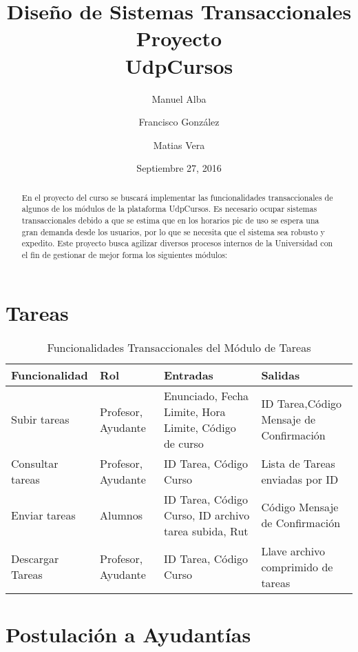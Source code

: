 \documentclass{article}
\title{Diseño de Sistemas Transaccionales \\ \huge Proyecto \\ \Huge UdpCursos }
\author{Manuel Alba \and Francisco González \and Matias Vera}
\date{Septiembre 27, 2016}
\begin{document}
\maketitle

\begin{abstract}
    En el proyecto del curso se buscará implementar las funcionalidades transaccionales de algunos de los módulos de la plataforma UdpCursos. Es necesario ocupar sistemas transaccionales debido a que se estima que en los horarios pic de uso se espera una gran demanda desde los usuarios, por lo que se necesita que el sistema sea robusto y expedito. Este proyecto busca agilizar diversos procesos internos de la Universidad con el fin de 
    gestionar de mejor forma los siguientes módulos:
\end{abstract}

\section{Tareas}

\begin{table}[h!]
\centering
\caption{Funcionalidades Transaccionales del Módulo de Tareas}
\begin{tabular}{|l|p{2.0cm}|p{4.0cm}|p{4.0cm}|}
\hline
Funcionalidad     & Rol                & Entradas & Salidas \\ \hline
Subir tareas      & Profesor, Ayudante & Enunciado, Fecha Limite, Hora Limite, Código de curso & ID Tarea,Código Mensaje de Confirmación\\ \hline
Consultar tareas  & Profesor, Ayudante & ID Tarea, Código Curso & Lista de Tareas enviadas por ID \\ \hline
Enviar tareas     & Alumnos            & ID Tarea, Código Curso, ID archivo tarea subida, Rut & Código Mensaje de Confirmación \\ \hline
Descargar Tareas  & Profesor, Ayudante & ID Tarea, Código Curso & Llave archivo comprimido de tareas \\ \hline
\end{tabular}
\end{table}
\newpage
\section{Postulación a Ayudantías}
\end{document}
